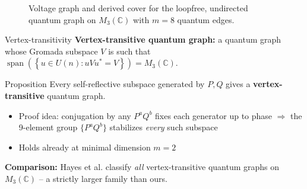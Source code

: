 \documentclass[aspectratio=169]{beamer}
\begin{document}
\begin{frame}
\begin{figure}[H]
\begin{minipage}[c]{0.515\textwidth}
        \end{minipage}
        \caption{Voltage graph and derived cover for the loopfree,
            undirected quantum graph on \( M_3 (\mathbb{C}) \) with \( m=8 \)
        quantum edges.}
        \label{fig:voltage-graph-m8-edges}
    \end{figure}
\end{frame}

\begin{frame}{Vertex-transitivity}
    \textbf{Vertex-transitive quantum graph:} a quantum graph whose Gromada
    subspace \( V \) is such that \( \operatorname{span}(\left\{ u
    \in U(n) : uVu^* = V \right\}) = M_3 (\mathbb{C})\).
    \begin{block}{Proposition}
        Every self-reflective subspace generated by $P, Q$ gives a
        \textbf{vertex-transitive} quantum graph.
    \end{block}
    \begin{itemize}
        \item Proof idea: conjugation by any $P^aQ^b$ fixes each generator
            up to phase $\Rightarrow$ the 9-element group
            $\{P^aQ^b\}$ stabilizes \emph{every} such subspace
        \item Holds already at minimal dimension $m=2$
    \end{itemize}
    \vspace{0.5em}
    \textbf{Comparison:} Hayes et al. classify \emph{all}
    vertex-transitive quantum graphs on $M_3 (\mathbb{C})$ -- a
    strictly larger family
    than ours.
\end{frame}
\end{document}
